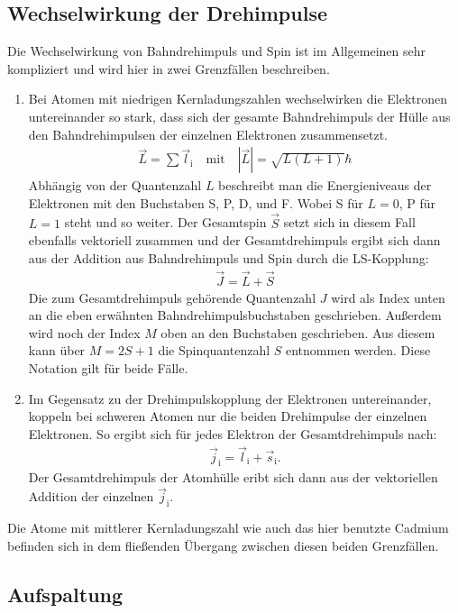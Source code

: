 \subsection{Wechselwirkung der Drehimpulse}

Die Wechselwirkung von Bahndrehimpuls und Spin ist im Allgemeinen sehr kompliziert und wird hier in zwei Grenzfällen beschreiben.

\begin{enumerate}
  \item Bei Atomen mit niedrigen Kernladungszahlen wechselwirken die Elektronen untereinander so stark, dass sich der gesamte Bahndrehimpuls der Hülle aus den Bahndrehimpulsen der einzelnen Elektronen zusammensetzt.
  \begin{align}
    \vec L = \sum \vec l_\text{i} \quad \text{mit} \quad |\vec L| = \sqrt{L(L+1)}\hbar
  \end{align}
  Abhängig von der Quantenzahl $L$ beschreibt man die Energieniveaus der Elektronen mit den Buchstaben S, P, D, und F. Wobei S für $L=0$, P für $L=1$ steht und so weiter. Der Gesamtspin $\vec S$ setzt sich in diesem Fall ebenfalls vektoriell zusammen und der Gesamtdrehimpuls ergibt sich dann aus der Addition aus Bahndrehimpuls und Spin durch die LS-Kopplung:
  \begin{align}
    \vec J = \vec L + \vec S
  \end{align}
  Die zum Gesamtdrehimpuls gehörende Quantenzahl $J$ wird als Index unten an die eben erwähnten Bahndrehimpulsbuchstaben geschrieben. Außerdem wird noch der Index $M$ oben an den Buchstaben geschrieben. Aus diesem kann über $M = 2S + 1$ die Spinquantenzahl $S$ entnommen werden. Diese Notation gilt für beide Fälle.
  \item Im Gegensatz zu der Drehimpulskopplung der Elektronen untereinander, koppeln bei schweren Atomen nur die beiden Drehimpulse der einzelnen Elektronen. So ergibt sich für jedes Elektron der Gesamtdrehimpuls nach:
  \begin{align}
    \vec j_\text{i} = \vec l_\text{i} + \vec s_\text{i}.
  \end{align}
  Der Gesamtdrehimpuls der Atomhülle eribt sich dann aus der vektoriellen Addition der einzelnen $\vec j_\text{i}$.
\end{enumerate}

Die Atome mit mittlerer Kernladungszahl wie auch das hier benutzte Cadmium befinden sich in dem fließenden Übergang zwischen diesen beiden Grenzfällen.
\subsection{Aufspaltung}

